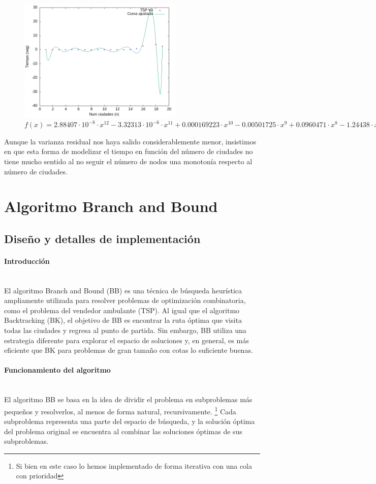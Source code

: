 \documentclass{article}
\newcommand{\myparagraph}[1]{\paragraph{#1}\mbox{}\\}
\begin{document}
\begin{figure}[H]
    \centering
    \includegraphics[width=0.7\textwidth]{imagenes/cota3/tiempos_bk.png}
    \caption*{$f(x)=2.88407 \cdot 10^{-8} \cdot x^{12} -3.32313 \cdot 10^{-6} \cdot x^{11} + 0.000169223 \cdot x^{10} -0.00501725  \cdot x^9 + 0.0960471 \cdot x^8 -1.24438 \cdot x^7 +11.1218  \cdot x^6 -68.6027 \cdot x^5 +287.395 \cdot x^4 -789.242  \cdot x^3 +1331.53 \cdot x^2 -1219.1 \cdot x +448.07$}
\end{figure}

Aunque la varianza residual nos haya salido considerablemente menor, insistimos en que esta forma de modelizar el tiempo en función del número de ciudades no tiene mucho sentido al no seguir el número de nodos una monotonía respecto al número de ciudades.

\newpage
\section{Algoritmo Branch and Bound}

\subsection{Diseño y detalles de implementación}

\myparagraph{Introducción}

El algoritmo Branch and Bound (BB) es una técnica de búsqueda heurística ampliamente utilizada para resolver problemas de optimización combinatoria, como el problema del vendedor ambulante (TSP). Al igual que el algoritmo Backtracking (BK), el objetivo de BB es encontrar la ruta óptima que visita todas las ciudades y regresa al punto de partida. Sin embargo, BB utiliza una estrategia diferente para explorar el espacio de soluciones y, en general, es más eficiente que BK para problemas de gran tamaño con cotas lo suficiente buenas.
\myparagraph{Funcionamiento del algoritmo}
El algoritmo BB se basa en la idea de dividir el problema en subproblemas más pequeños y resolverlos, al menos de forma natural, recursivamente. \footnote{Si bien en este caso lo hemos implementado de forma iterativa con una cola con prioridad} Cada subproblema representa una parte del espacio de búsqueda, y la solución óptima del problema original se encuentra al combinar las soluciones óptimas de sus subproblemas.
\end{document}
